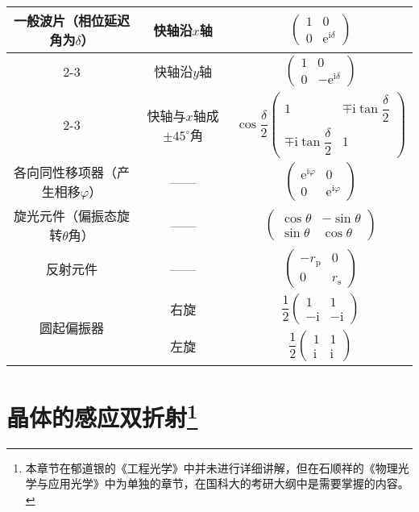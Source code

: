 \documentclass[cn,10pt,chinesefont=founder,math=mtpro2,cite=super,toc=onecol,twoside]{elegantbook}
\begin{document}
\begin{table}[htbp]
\begin{tabular}{c|c|c}
			\hline
			\multirow{7}{*}{一般波片（相位延迟角为$\delta$）}& 快轴沿$x$轴 & $\begin{pmatrix} 1&0\\ 0&\mathrm{e}^{\mathrm{i}\delta} \end{pmatrix}$\\
			\cline{2-3}
			& 快轴沿$y$轴 & $\begin{pmatrix} 1&0\\ 0&-\mathrm{e}^{\mathrm{i}\delta} \end{pmatrix}$\\
			\cline{2-3}
			& 快轴与$x$轴成$\pm45^{\circ}$角 & $\cos\dfrac{\delta}{2}\begin{pmatrix} 1&\mp\mathrm{i}\tan\dfrac{\delta}{2}\\ \mp\mathrm{i}\tan\dfrac{\delta}{2}&1 \end{pmatrix}$\\
			\hline
			各向同性移项器（产生相移$\varphi$）& —— & $\begin{pmatrix} \mathrm{e}^{\mathrm{i}\varphi}&0\\ 0&\mathrm{e}^{\mathrm{i}\varphi} \end{pmatrix}$\\
			\hline
			旋光元件（偏振态旋转$\theta$角）& —— & $\begin{pmatrix} \cos\theta&-\sin\theta\\ \sin\theta&\cos\theta \end{pmatrix}$\\
			\hline
			反射元件& —— & $\begin{pmatrix} -r_{\mathrm{p}}&0\\ 0&r_{\mathrm{s}} \end{pmatrix}$\\
			\hline
			\multirow{3}{*}{圆起偏振器}& 右旋 & $\dfrac{1}{2}\begin{pmatrix} 1&1\\ -\mathrm{i}&-\mathrm{i} \end{pmatrix}$\\
			\cline{2-3}
			& 左旋 & $\dfrac{1}{2}\begin{pmatrix} 1&1\\ \mathrm{i}&\mathrm{i} \end{pmatrix}$\\
			\hline
		\end{tabular}
	\label{tab:jones-matrix-of-typical-polarizers}
\end{table}

\chapter{晶体的感应双折射\footnote{本章节在郁道银的《工程光学》中并未进行详细讲解，但在石顺祥的《物理光学与应用光学》中为单独的章节，在国科大的考研大纲中是需要掌握的内容。}}
\end{document}
